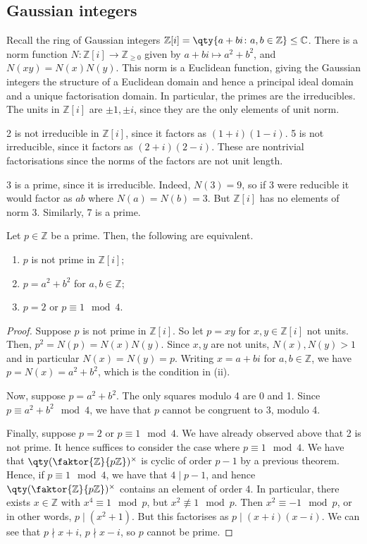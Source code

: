\subsection{Gaussian integers}
Recall the ring of Gaussian integers $\mathbb Z[i] = \qty{a+bi \colon a, b \in \mathbb Z} \leq \mathbb C$.
There is a norm function $N \colon \mathbb Z[i] \to \mathbb Z_{\geq 0}$ given by $a + bi \mapsto a^2 + b^2$, and $N(xy) = N(x) N(y)$.
This norm is a Euclidean function, giving the Gaussian integers the structure of a Euclidean domain and hence a principal ideal domain and a unique factorisation domain.
In particular, the primes are the irreducibles.
The units in $\mathbb Z[i]$ are $\pm 1, \pm i$, since they are the only elements of unit norm.
\begin{example}
	2 is not irreducible in $\mathbb Z[i]$, since it factors as $(1+i)(1-i)$.
	5 is not irreducible, since it factors as $(2+i)(2-i)$.
	These are nontrivial factorisations since the norms of the factors are not unit length.

	3 is a prime, since it is irreducible.
	Indeed, $N(3) = 9$, so if 3 were reducible it would factor as $ab$ where $N(a) = N(b) = 3$.
	But $\mathbb Z[i]$ has no elements of norm 3.
	Similarly, 7 is a prime.
\end{example}
\begin{proposition}
	Let $p \in \mathbb Z$ be a prime.
	Then, the following are equivalent.
	\begin{enumerate}
		\item $p$ is not prime in $\mathbb Z[i]$;
		\item $p = a^2 + b^2$ for $a, b \in \mathbb Z$;
		\item $p = 2$ or $p \equiv 1 \mod 4$.
	\end{enumerate}
\end{proposition}
\begin{proof}
	Suppose $p$ is not prime in $\mathbb Z[i]$.
	So let $p = xy$ for $x, y \in \mathbb Z[i]$ not units.
	Then, $p^2 = N(p) = N(x)N(y)$.
	Since $x, y$ are not units, $N(x), N(y) > 1$ and in particular $N(x) = N(y) = p$.
	Writing $x = a+bi$ for $a, b \in \mathbb Z$, we have $p = N(x) = a^2 + b^2$, which is the condition in (ii).

	Now, suppose $p = a^2 + b^2$.
	The only squares modulo 4 are 0 and 1.
	Since $p \equiv a^2 + b^2 \mod 4$, we have that $p$ cannot be congruent to 3, modulo 4.

	Finally, suppose $p = 2$ or $p \equiv 1 \mod 4$.
	We have already observed above that 2 is not prime.
	It hence suffices to consider the case where $p \equiv 1 \mod 4$.
	We have that $\qty(\faktor{\mathbb Z}{p\mathbb Z})^\times$ is cyclic of order $p-1$ by a previous theorem.
	Hence, if $p \equiv 1 \mod 4$, we have that $4 \mid p-1$, and hence $\qty(\faktor{\mathbb Z}{p\mathbb Z})^\times$ contains an element of order 4.
	In particular, there exists $x \in \mathbb Z$ with $x^4 \equiv 1 \mod p$, but $x^2 \not\equiv 1 \mod p$.
	Then $x^2 \equiv -1 \mod p$, or in other words, $p \mid (x^2 + 1)$.
	But this factorises as $p \mid (x+i)(x-i)$.
	We can see that $p \nmid x+i$, $p \nmid x-i$, so $p$ cannot be prime.
\end{proof}
